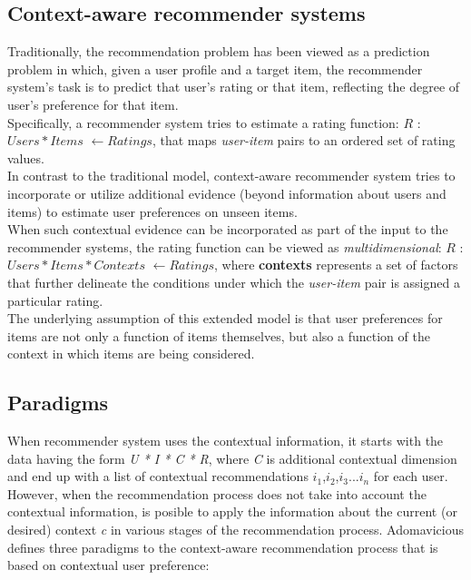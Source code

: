 \subsection{Context-aware recommender systems}

Traditionally, the recommendation problem has been viewed as a prediction
problem in which, given a user profile and a target item, the recommender
system’s task is to predict that user’s rating or that item, reflecting the
degree of user’s preference for that item. \\  Specifically, a recommender system
tries to estimate a rating function:  $R$ : $Users * Items$ $ 
\leftarrow Ratings$, that maps \textit{user-item} pairs to an ordered 
set of rating values.\\ 
In contrast to the traditional model, context-aware recommender system tries to
incorporate or utilize additional evidence (beyond information about users and
items) to estimate user preferences on unseen items. \\ When such contextual
evidence can be incorporated as part of the input to the recommender systems,
the rating function can be viewed as  \textit{multidimensional}: $R$ : $Users *
Items * Contexts$ $ \leftarrow Ratings$, where \textbf{contexts} represents a set of
factors that further delineate the conditions under which the \textit{user-item}
pair is assigned a particular rating. \\ The underlying assumption of this extended
model is that user preferences for items are not only a function of items
themselves, but also a function of the context in which items are being
considered\cite{lim2009assessing}.

\subsection{Paradigms}

When recommender system uses the contextual information, it starts
with the data having the form \textit{U * I * C * R}, where \textit{C}
is additional contextual   dimension and end up with a list of
contextual recommendations  $i_{1}$,$i_{2}$,$i_{3}$...$i_{n}$ for each
user. However, when the recommendation process does not take into
account  the contextual information, is posible to apply the
information about the current (or desired) context \textit{c} in
various stages of the recommendation process.  Adomavicious defines
three paradigms to the context-aware recommendation process that is
based on contextual user preference:

